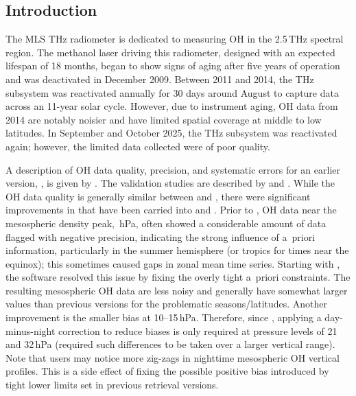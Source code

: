
\subsection{Introduction}

The MLS THz radiometer is dedicated to measuring OH in the 2.5\,THz spectral region. The methanol laser driving this radiometer, designed with an expected lifespan of 18 months, began to show signs of aging after five years of operation and was deactivated in December 2009. Between 2011 and 2014, the THz subsystem was reactivated annually for 30 days around August to capture data across an 11-year solar cycle. However, due to instrument aging, OH data from 2014 are notably noisier and have limited spatial coverage at middle to low latitudes. In September and October 2025, the THz subsystem was reactivated again; however, the limited data collected were of poor quality. 

A description of OH data quality, precision, and systematic errors for an earlier version, \vii, is given by \citet{PickettEtal:2006:Validation}. The validation studies are described by \citet{PickettEtal:2008} and \citet{WangEtal:2008}. While the OH data quality is generally similar between \vii and \viii, there were significant improvements in \viv that have been carried into \prevv and \thisv. Prior to \viv, OH data near the mesospheric density peak, \,hPa, often showed a considerable amount of data flagged with negative precision, indicating the strong influence of a~priori information, particularly in the summer hemisphere (or tropics for times near the equinox); this sometimes caused gaps in zonal mean time series. Starting with \viv, the software resolved this issue by fixing the overly tight a~priori constraints. The resulting mesospheric OH data are less noisy and generally have somewhat larger values than previous versions for the problematic seasons/latitudes. Another improvement is the smaller bias at 10--15\,hPa. Therefore, since \viv, applying a day-minus-night correction to reduce biases is only required at pressure levels of 21 and 32\,hPa (\viii required such differences to be taken over a larger vertical range). Note that users may notice more zig-zags in nighttime mesospheric OH vertical profiles. This is a side effect of fixing the possible positive bias introduced by tight lower limits set in previous retrieval versions.

